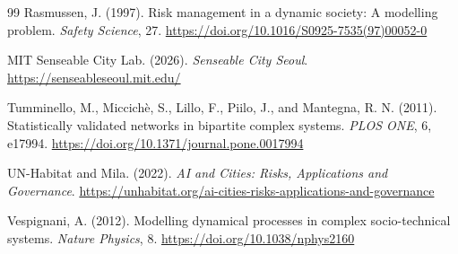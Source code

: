 \documentclass[11pt,a4paper]{article}
\begin{document}
\begin{thebibliography}{99}
Rasmussen, J. (1997).
Risk management in a dynamic society: A modelling problem.
\textit{Safety Science}, 27.
\url{https://doi.org/10.1016/S0925-7535(97)00052-0}

MIT Senseable City Lab. (2026).
\textit{Senseable City Seoul}.
\url{https://senseableseoul.mit.edu/}

Tumminello, M., Miccichè, S., Lillo, F., Piilo, J., and Mantegna, R. N. (2011).
Statistically validated networks in bipartite complex systems.
\textit{PLOS ONE}, 6, e17994.
\url{https://doi.org/10.1371/journal.pone.0017994}

UN-Habitat and Mila. (2022).
\textit{AI and Cities: Risks, Applications and Governance}.
\url{https://unhabitat.org/ai-cities-risks-applications-and-governance}

Vespignani, A. (2012).
Modelling dynamical processes in complex socio-technical systems.
\textit{Nature Physics}, 8.
\url{https://doi.org/10.1038/nphys2160}

\end{thebibliography}
\end{document}

